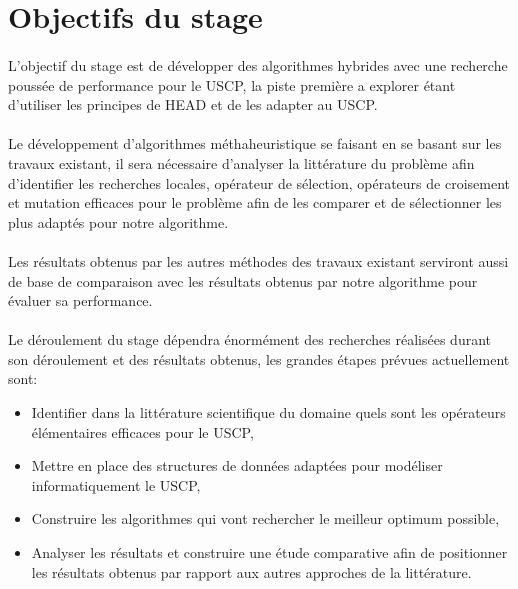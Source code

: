 \documentclass[a4paper,11pt,twoside,french,report]{../common/simplem}
\begin{document}
		\section{Objectifs du stage}
			\paragraph*{}
				L'objectif du stage est de développer des algorithmes hybrides avec une recherche poussée de performance pour le \gls{USCP}, la piste première a explorer étant d'utiliser les principes de \gls{HEAD} et de les adapter au \gls{USCP}.
			\paragraph*{}
				Le développement d'algorithmes méthaheuristique se faisant en se basant sur les travaux existant, il sera nécessaire d'analyser la littérature du problème afin d'identifier les recherches locales, opérateur de sélection, opérateurs de croisement et mutation efficaces pour le problème afin de les comparer et de sélectionner les plus adaptés pour notre algorithme.
			\paragraph*{}
				Les résultats obtenus par les autres méthodes des travaux existant serviront aussi de base de comparaison avec les résultats obtenus par notre algorithme pour évaluer sa performance.
			\paragraph*{}
				Le déroulement du stage dépendra énormément des recherches réalisées durant son déroulement et des résultats obtenus, les grandes étapes prévues actuellement sont:
				\begin{itemize}
					\item Identifier dans la littérature scientifique du domaine quels sont les opérateurs élémentaires efficaces pour le \gls{USCP},
					\item Mettre en place des structures de données adaptées pour modéliser informatiquement le \gls{USCP},
					\item Construire les algorithmes qui vont rechercher le meilleur optimum possible,
					\item Analyser les résultats et construire une étude comparative afin de positionner les résultats obtenus par rapport aux autres approches de la littérature.
				\end{itemize}
\end{document}

